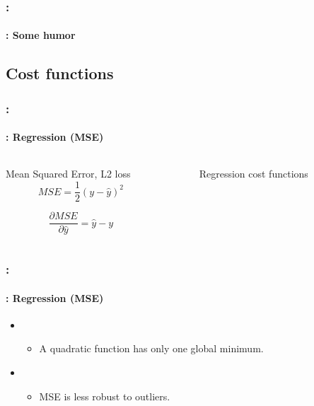 \documentclass[xcolor=table]{beamer}
\begin{document}
\begin{frame}
	\frametitle{\insertshortsubtitle: \insertsection}
	\framesubtitle{\insertsubsection: Some humor}
	
	\begin{center}
	\end{center}
	
\end{frame}

\subsection{Cost functions}

\begin{frame}
	\frametitle{\insertshortsubtitle: \insertsection}
	\framesubtitle{\insertsubsection: Regression (MSE)}
	
	\begin{columns}
		\begin{column}{.68\linewidth}
			\begin{block}{Mean Squared Error, L2 loss}
				\[MSE = \frac{1}{2} (y - \hat{y})^2\]
				
				\[
				\frac{\partial MSE}{\partial \hat{y}} = \hat{y} - y
				\]
			\end{block}
		\end{column}%
		\begin{column}{.3\linewidth}
			\begin{figure}
				\caption{Regression cost functions \cite{2017-rosenberg}}
			\end{figure}
		\end{column}
	\end{columns}


\end{frame}

\begin{frame}
	\frametitle{\insertshortsubtitle: \insertsection}
	\framesubtitle{\insertsubsection: Regression (MSE)}

	\begin{itemize}
		\item {}
		\begin{itemize}
			\item A quadratic function has only one global minimum.
		\end{itemize}
		\item {}
		\begin{itemize}
			\item MSE is less robust to outliers.
		\end{itemize}
	\end{itemize}

\end{frame}
\end{document}
